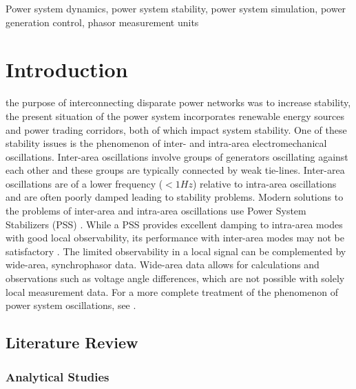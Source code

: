 \documentclass{ieeeaccess}
\begin{document}
\begin{keywords}
Power system dynamics, power system stability, power system simulation, power generation control, phasor measurement units
\end{keywords}

\titlepgskip=-15pt

\maketitle

\section{Introduction}
\label{sec:introduction}
 the purpose of interconnecting disparate power networks was to increase stability, the present situation of the power system incorporates renewable energy sources and power trading corridors, both of which impact system stability. One of these stability issues is the phenomenon of inter- and intra-area electromechanical oscillations\cite{KundurTwoArea}. Inter-area oscillations involve groups of generators oscillating against each other and these groups are typically connected by weak tie-lines\cite{KundurTwoArea}. Inter-area oscillations are of a lower frequency ($<1 Hz$) relative to intra-area oscillations and are often poorly damped leading to stability problems\cite{KundurTwoArea}. Modern solutions to the problems of inter-area and intra-area oscillations use Power System Stabilizers (PSS) \cite{WAPODNorway}. While a PSS provides excellent damping to intra-area modes with good local observability, its performance with inter-area modes may not be satisfactory \cite{localREMcomparison}. The limited observability in a local signal can be complemented by wide-area, synchrophasor data. Wide-area data allows for calculations and observations such as voltage angle differences, which are not possible with solely local measurement data\cite{Yuwa}. For a more complete treatment of the phenomenon of power system oscillations, see \cite{Rogers_book}.


\subsection{Literature Review}

\subsubsection{Analytical Studies}
\end{document}
